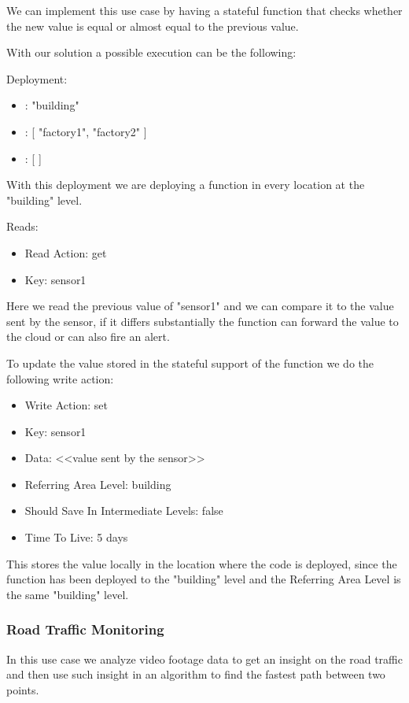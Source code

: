We can implement this use case by having a stateful function that checks whether the new value is equal or almost equal to the previous value.

With our solution a possible execution can be the following:
\begin{example}
Deployment:
\begin{itemize}
    \item {}: "building"
    \item {}: [ "factory1", "factory2" ]
    \item {}: [ ]
\end{itemize}
With this deployment we are deploying a function in every location at the "building" level.

Reads:
\begin{itemize}
    \item Read Action: get
    \item Key: sensor1
\end{itemize}
Here we read the previous value of "sensor1" and we can compare it to the value sent by the sensor, if it differs substantially the function can forward the value to the cloud or can also fire an alert.

To update the value stored in the stateful support of the function we do the following write action:
\begin{itemize}
    \item Write Action: set
    \item Key: sensor1
    \item Data: <<value sent by the sensor>>
    \item Referring Area Level: building
    \item Should Save In Intermediate Levels: false
    \item Time To Live: 5 days
\end{itemize}
This stores the value locally in the location where the code is deployed, since the function has been deployed to the "building" level and the Referring Area Level is the same "building" level.
\end{example}


\subsubsection{Road Traffic Monitoring}
In this use case we analyze video footage data to get an insight on the road traffic and then use such insight in an algorithm to find the fastest path between two points.

